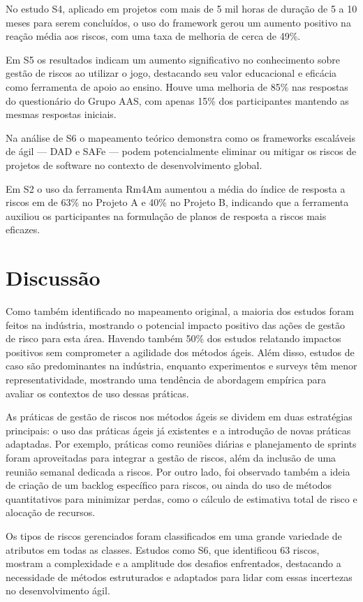 \documentclass[
	12pt,
	openright,
	twoside,
	a4paper,
	english,
	brazil
	]{abntex2}
\begin{document}
No estudo S4, aplicado em projetos com mais de 5 mil horas de duração de 5 a 10 meses para serem concluídos, o uso do framework gerou um aumento positivo na reação média aos riscos, com uma taxa de melhoria de cerca de 49\%.

Em S5 os resultados indicam um aumento significativo no conhecimento sobre gestão de riscos ao utilizar o jogo, destacando seu valor educacional e eficácia como ferramenta de apoio ao ensino. Houve uma melhoria de 85\% nas respostas do questionário do Grupo AAS, com apenas 15\% dos participantes mantendo as mesmas respostas iniciais.

Na análise de S6 o mapeamento teórico demonstra como os frameworks escaláveis de ágil — DAD e SAFe — podem potencialmente eliminar ou mitigar os riscos de projetos de software no contexto de desenvolvimento global.

Em S2 o uso da ferramenta Rm4Am aumentou a média do índice de resposta a riscos em de 63\% no Projeto A e 40\% no Projeto B, indicando que a ferramenta auxiliou os participantes na formulação de planos de resposta a riscos mais eficazes.

\section{Discussão}

Como também identificado no mapeamento original, a maioria dos estudos foram feitos na indústria, mostrando o potencial impacto positivo das ações de gestão de risco para esta área. Havendo também 50\% dos estudos relatando impactos positivos sem comprometer a agilidade dos métodos ágeis. Além disso, estudos de caso são predominantes na indústria, enquanto experimentos e surveys têm menor representatividade, mostrando uma tendência de abordagem empírica para avaliar os contextos de uso dessas práticas.

As práticas de gestão de riscos nos métodos ágeis se dividem em duas estratégias principais: o uso das práticas ágeis já existentes e a introdução de novas práticas adaptadas. Por exemplo, práticas como reuniões diárias e planejamento de sprints foram aproveitadas para integrar a gestão de riscos, além da inclusão de uma reunião semanal dedicada a riscos. Por outro lado, foi observado também a ideia de criação de um backlog específico para riscos, ou ainda do uso de métodos quantitativos para minimizar perdas, como o cálculo de estimativa total de risco e alocação de recursos.

Os tipos de riscos gerenciados foram classificados em uma grande variedade de atributos em todas as classes. Estudos como S6, que identificou 63 riscos, mostram a complexidade e a amplitude dos desafios enfrentados, destacando a necessidade de métodos estruturados e adaptados para lidar com essas incertezas no desenvolvimento ágil.
\end{document}
